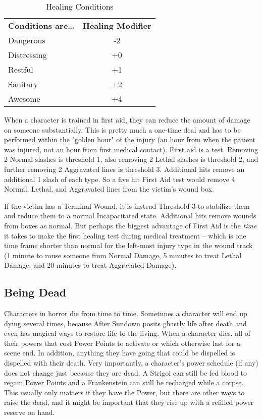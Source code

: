 \begin{wraptable}[7]{R}{7.2cm} \vspace{-1.2cm}
 \caption{Healing Conditions} \centering
\begin{tabular}{l c}
\textbf{Conditions are\ldots{}}&\textbf{Healing Modifier}\\
Dangerous&-2\\
Distressing&+0\\
Restful&+1\\
Sanitary&+2\\
Awesome&+4\\
\end{tabular}
\end{wraptable}

\hspace{\parindent} When a character is trained in first aid, they can reduce the amount of damage on someone substantially. This is pretty much a one-time deal and has to be performed within the "golden hour" of the injury (an hour from when the patient was injured, not an hour from first medical contact). First aid is a  test. Removing 2 Normal slashes is threshold 1, also removing 2 Lethal slashes is threshold 2, and further removing 2 Aggravated lines is threshold 3. Additional hits remove an additional 1 slash of each type. So a five hit First Aid test would remove 4 Normal, Lethal, and Aggravated lines from the victim's wound box.

If the victim has a Terminal Wound, it is instead Threshold 3 to stabilize them and reduce them to a normal Incapacitated state. Additional hits remove wounds from boxes as normal. But perhaps the biggest advantage of First Aid is the \textit{time} it takes to make the first healing test during medical treatment -- which is one time frame shorter than normal for the left-most injury type in the wound track (1 minute to rouse someone from Normal Damage, 5 minutes to treat Lethal Damage, and 20 minutes to treat Aggravated Damage).

\subsection{Being Dead} 

Characters in horror die from time to time. Sometimes a character will end up dying several times, because After Sundown posits ghastly life after death and even has magical ways to restore life to the living. When a character dies, all of their powers that cost Power Points to activate or which otherwise last for a scene end. In addition, anything they have going that could be dispelled is dispelled with their death. Very importantly, a character's power schedule (if any) does not change just because they are dead. A Strigoi can still be fed blood to regain Power Points and a Frankenstein can still be recharged while a corpse. This usually only matters if they have the  Power, but there are other ways to raise the dead, and it might be important that they rise up with a refilled power reserve on hand.

